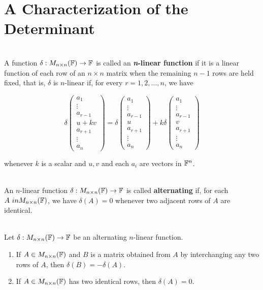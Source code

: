 \section{A Characterization of the Determinant}

\begin{definition}
	\hfill\\
	A function $\delta: M_{n \times n}(\mathbb{F}) \to \mathbb{F}$ is called an \textbf{\textit{n}-linear function} if it is a linear function of each row of an $n \times n$ matrix when the remaining $n-1$ rows are held fixed, that is, $\delta$ is $n$-linear if, for every $r = 1, 2, \dots, n$, we have
	
	\[\delta\begin{pmatrix}
		a_1 \\ \vdots \\ a_{r-1} \\ u+kv \\ a_{r + 1} \\ \vdots \\ a_n
	\end{pmatrix} = \delta\begin{pmatrix}
	a_1 \\ \vdots \\ a_{r-1} \\ u \\ a_{r + 1} \\ \vdots \\ a_n
	\end{pmatrix} + k\delta\begin{pmatrix}
	a_1 \\ \vdots \\ a_{r-1} \\ v \\ a_{r+1} \\ \vdots \\ a_n
	\end{pmatrix}\]
	
	whenever $k$ is a scalar and $u,v$ and each $a_i$ are vectors in $\mathbb{F}^n$.
\end{definition}

\begin{definition}
	\hfill\\
	An $n$-linear function $\delta: M_{n \times n}(\mathbb{F}) \to \mathbb{F}$ is called \textbf{alternating} if, for each $A \ in M_{n \times n}(\mathbb{F})$, we have $\delta(A) = 0$ whenever two adjacent rows of $A$ are identical.
\end{definition}

\begin{theorem}
	\hfill\\
	Let $\delta: M_{n \times n}(\mathbb{F}) \to \mathbb{F}$ be an alternating $n$-linear function.
	
	\begin{enumerate}
		\item If $A \in M_{n \times n}(\mathbb{F})$ and $B$ is a matrix obtained from $A$ by interchanging any two rows of $A$, then $\delta(B) = -\delta(A)$.
		\item If $A \in M_{n \times n}(\mathbb{F})$ has two identical rows, then $\delta(A) = 0$.
	\end{enumerate}
\end{theorem}

